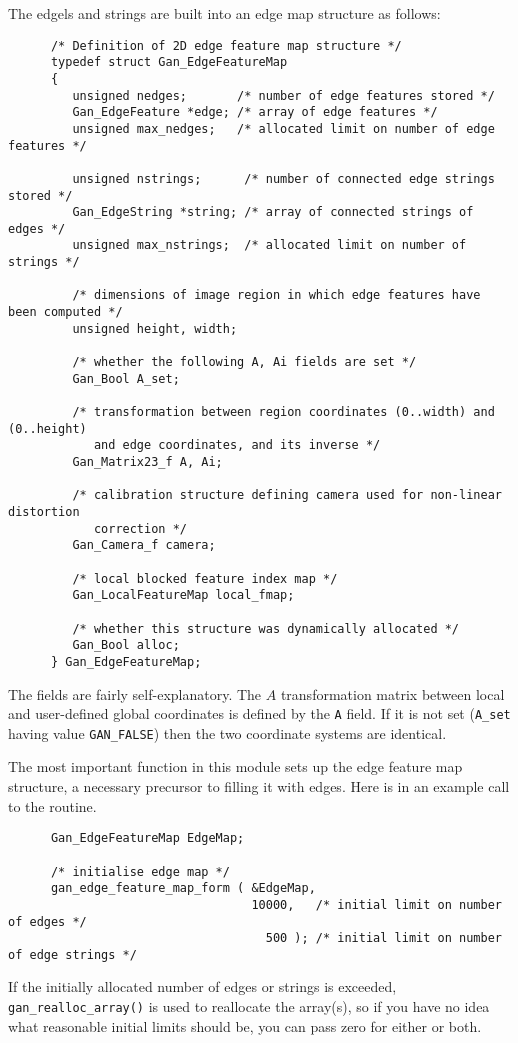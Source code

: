 The edgels and strings are built into an edge map structure as follows:
\begin{verbatim}
      /* Definition of 2D edge feature map structure */
      typedef struct Gan_EdgeFeatureMap
      {
         unsigned nedges;       /* number of edge features stored */
         Gan_EdgeFeature *edge; /* array of edge features */
         unsigned max_nedges;   /* allocated limit on number of edge features */

         unsigned nstrings;      /* number of connected edge strings stored */
         Gan_EdgeString *string; /* array of connected strings of edges */
         unsigned max_nstrings;  /* allocated limit on number of strings */
      
         /* dimensions of image region in which edge features have been computed */
         unsigned height, width;

         /* whether the following A, Ai fields are set */
         Gan_Bool A_set;

         /* transformation between region coordinates (0..width) and (0..height)
            and edge coordinates, and its inverse */
         Gan_Matrix23_f A, Ai;
      
         /* calibration structure defining camera used for non-linear distortion
            correction */
         Gan_Camera_f camera;

         /* local blocked feature index map */
         Gan_LocalFeatureMap local_fmap;

         /* whether this structure was dynamically allocated */
         Gan_Bool alloc;
      } Gan_EdgeFeatureMap;
\end{verbatim}
The fields are fairly self-explanatory. The $A$ transformation matrix
between local and user-defined global coordinates is defined by the {\tt A}
field. If it is not set ({\tt A\_set} having value {\tt GAN\_FALSE}) then
the two coordinate systems are identical.

The most important function in this module sets up the edge feature map
structure, a necessary precursor to filling it with edges. Here is in an
example call to the routine.
\begin{verbatim}
      Gan_EdgeFeatureMap EdgeMap;

      /* initialise edge map */
      gan_edge_feature_map_form ( &EdgeMap,
                                  10000,   /* initial limit on number of edges */
                                    500 ); /* initial limit on number of edge strings */
\end{verbatim}
If the initially allocated number of edges or strings is exceeded,
{\tt gan\_realloc\_array()} is used to reallocate the array(s),
so if you have no idea what reasonable initial limits should be,
you can pass zero for either or both.


